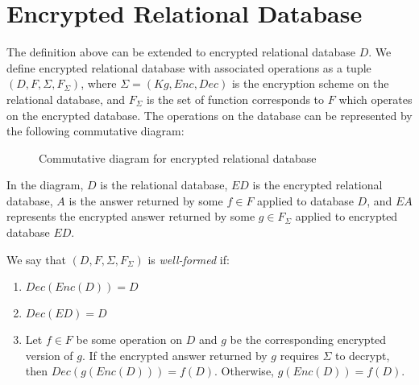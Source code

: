 \section{Encrypted Relational Database}
The definition above can be extended to encrypted relational database $D$. We define encrypted relational database with associated operations as a tuple $(D, F, \Sigma, F_\Sigma)$, where $\Sigma = (Kg, Enc, Dec)$ is the encryption scheme on the relational database, and $F_\Sigma$ is the set of function corresponds to $F$ which operates on the encrypted database. The operations on the database can be represented by the following commutative diagram:

\begin{figure}[H]
\begin{center}
\end{center}
\caption{Commutative diagram for encrypted relational database}
\end{figure}

In the diagram, $D$ is the relational database, $ED$ is the encrypted relational database, $A$ is the answer returned by some $f \in F$ applied to database $D$, and $EA$ represents the encrypted answer returned by some $g \in F_\Sigma$ applied to encrypted database $ED$.

We say that $(D, F, \Sigma, F_\Sigma)$ is \textit{well-formed} if:
\begin{enumerate}
\item $Dec(Enc(D)) = D$
\item $Dec(ED) = D$
\item Let $f \in F$ be some operation on $D$ and $g$ be the corresponding encrypted version of $g$. If the encrypted answer returned by $g$ requires $\Sigma$ to decrypt, then $Dec(g(Enc(D))) = f(D)$. Otherwise, $g(Enc(D)) = f(D)$. 
\end{enumerate}

